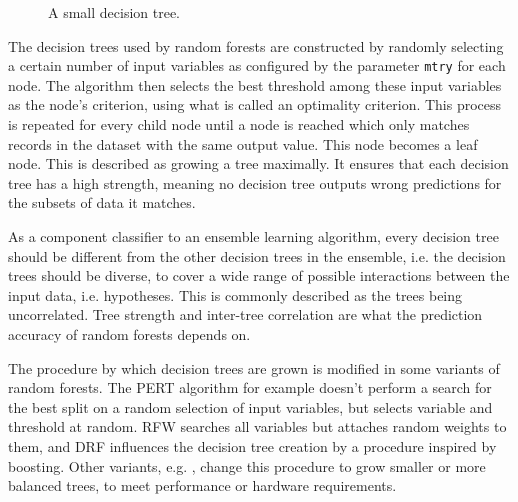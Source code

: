 \documentclass[a4paper,man,12pt,apacite,floatsintext,draftfirst]{apa6} %
\begin{document}
\begin{figure}
\caption{A small decision tree.}
\begin{center}
\end{center}
\end{figure}

The decision trees used by random forests are constructed by randomly
selecting a certain number of input variables as configured by the parameter
\texttt{mtry} for each node.
The algorithm then selects the best threshold among these input
variables as the node's criterion, using what is called an optimality criterion.
This process is repeated for every child node until a node is reached
which only matches records in the dataset with the same output value.
This node becomes a leaf node.
This is described as growing a tree maximally.
It ensures that each decision tree has a high strength,
meaning no decision tree outputs wrong predictions for the subsets of data
it matches. \cite{breiman2001random}

As a component classifier to an ensemble learning algorithm,
every decision tree should be different from the other decision trees in
the ensemble, i.e. the decision trees should be diverse,
to cover a wide range of possible interactions between the input data,
i.e. hypotheses.
This is commonly described as the trees being uncorrelated.
Tree strength and inter-tree correlation are what the prediction accuracy
of random forests depends on. \cite{breiman2001random}

The procedure by which decision trees are grown is modified in some
variants of random forests.
The PERT algorithm \cite{cutler2001pert} for example doesn't perform a
search for the best split on a random selection of input variables,
but selects variable and threshold at random.
RFW \cite{maudes2012random} searches all variables but attaches random
weights to them, and DRF \cite{bernard2012dynamic} influences the
decision tree creation by a procedure inspired by boosting.
Other variants, e.g. \cite{van2012accelerating}, change this procedure to
grow smaller or more balanced trees, to meet performance or
hardware requirements.
\end{document}
